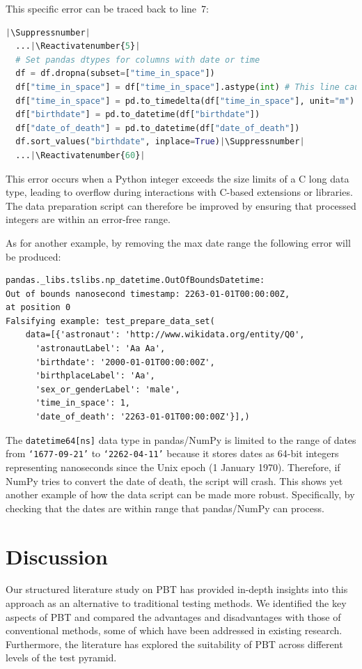 \documentclass[runningheads]{llncs}
\makeatletter
\let\origthelstnumber\thelstnumber
\newcommand*\Suppressnumber{%
  \lst@AddToHook{OnNewLine}{%
    \let\thelstnumber\relax%
     \advance\c@lstnumber-\@ne\relax%
    }%
}
\newcommand*\Reactivatenumber[1]{%
  \setcounter{lstnumber}{\numexpr#1-1\relax}
  \lst@AddToHook{OnNewLine}{%
   \let\thelstnumber\origthelstnumber%
   \refstepcounter{lstnumber}%
  }%
}
\makeatother
\begin{document}
\noindent This specific error can be traced back to line~7:

\begin{lstlisting}[language=Python,caption={Overflow Error from code/data\_analysis.ipynb}]
  |\Suppressnumber|
  ...|\Reactivatenumber{5}|
  # Set pandas dtypes for columns with date or time
  df = df.dropna(subset=["time_in_space"])
  df["time_in_space"] = df["time_in_space"].astype(int) # This line caused the error
  df["time_in_space"] = pd.to_timedelta(df["time_in_space"], unit="m")
  df["birthdate"] = pd.to_datetime(df["birthdate"])
  df["date_of_death"] = pd.to_datetime(df["date_of_death"])
  df.sort_values("birthdate", inplace=True)|\Suppressnumber|
  ...|\Reactivatenumber{60}|

\end{lstlisting}
This error occurs when a Python integer exceeds the size limits of a C long data type, leading to overflow during interactions with C-based extensions or libraries. The data preparation script can therefore be improved by ensuring that processed integers are within an error-free range.

\newpage
\noindent As for another example, by removing the max date range the following error will be produced:

\begin{verbatim}
pandas._libs.tslibs.np_datetime.OutOfBoundsDatetime: 
Out of bounds nanosecond timestamp: 2263-01-01T00:00:00Z, 
at position 0
Falsifying example: test_prepare_data_set(
    data=[{'astronaut': 'http://www.wikidata.org/entity/Q0',
      'astronautLabel': 'Aa Aa',
      'birthdate': '2000-01-01T00:00:00Z',
      'birthplaceLabel': 'Aa',
      'sex_or_genderLabel': 'male',
      'time_in_space': 1,
      'date_of_death': '2263-01-01T00:00:00Z'}],) 
\end{verbatim}

\vspace{5mm}
\noindent The \texttt{datetime64[ns]} data type in pandas/NumPy is limited to the range of dates from \texttt{`1677-09-21'} to \texttt{`2262-04-11'} because it stores dates as 64-bit integers representing nanoseconds since the Unix epoch (1 January 1970). Therefore, if NumPy tries to convert the date of death, the script will crash. This shows yet another example of how the data script can be made more robust. Specifically, by checking that the dates are within range that pandas/NumPy can process.

\section{Discussion}
Our structured literature study on PBT has provided in-depth insights into this approach as an alternative to traditional testing methods. We identified the key aspects of PBT and compared the advantages and disadvantages with those of conventional methods, some of which have been addressed in existing research. Furthermore, the literature has explored the suitability of PBT across different levels of the test pyramid.
\end{document}
